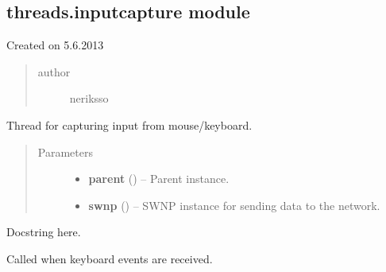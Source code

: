 \documentclass[letterpaper,10pt,english]{sphinxmanual}
\begin{document}
\subsection{threads.inputcapture module}
\label{threads:module-threads.inputcapture}\label{threads:threads-inputcapture-module}
Created on 5.6.2013
\begin{quote}\begin{description}
\item[{author}] \leavevmode
neriksso

\end{description}\end{quote}

\begin{fulllineitems}
\label{threads:threads.inputcapture.INPUT_CAPTURE}
Thread for capturing input from mouse/keyboard.
\begin{quote}\begin{description}
\item[{Parameters}] \leavevmode\begin{itemize}
\item {} 
\textbf{parent} () -- Parent instance.

\item {} 
\textbf{swnp} ({\hyperref[swnp:swnp.SWNP]{}}) -- SWNP instance for sending data to the network.

\end{itemize}

\end{description}\end{quote}

\begin{fulllineitems}
\label{threads:threads.inputcapture.INPUT_CAPTURE.hook}
Docstring here.

\end{fulllineitems}


\begin{fulllineitems}
\label{threads:threads.inputcapture.INPUT_CAPTURE.on_keyboard_event}
Called when keyboard events are received.


\end{fulllineitems}
\end{fulllineitems}
\end{document}
